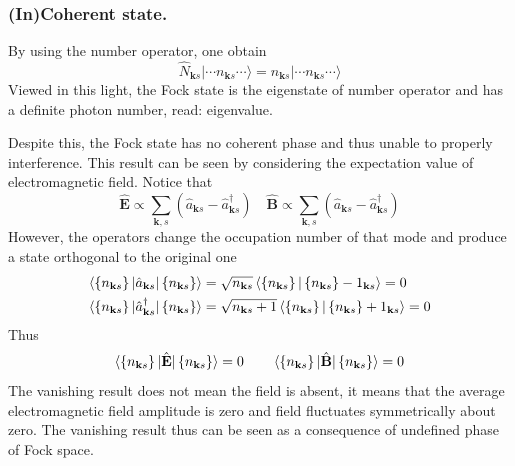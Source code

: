 \documentclass[../../../main.tex]{subfiles}
\begin{document}
\subsubsection{(In)Coherent state.}
By using the number operator, one obtain
\begin{equation*}
  \hat{N}_{\mathbf{k }s} | \cdots n_{\mathbf{k }s} \cdots \rangle = n_{\mathbf{k }s}  | \cdots n_{\mathbf{k }s}  \cdots \rangle
\end{equation*}
Viewed in this light, the Fock state is the eigenstate of number operator and has a definite photon number, read: eigenvalue.

Despite this, the Fock state has no coherent phase and thus unable to properly interference.
This result can be seen by considering the expectation value of electromagnetic field.
Notice that
\begin{equation*}
  \hat{\mathbf{E}} \propto \sum_{\mathbf{k},s} \left( \hat{a}_{\mathbf{k }s} -\hat{a}^\dagger_{\mathbf{k }s}  \right) \quad
  \hat{\mathbf{B}} \propto \sum_{\mathbf{k},s} \left( \hat{a}_{\mathbf{k }s} -\hat{a}^\dagger_{\mathbf{k }s}  \right)
\end{equation*}
However, the operators change the occupation number of that mode and produce a state orthogonal to the original one
\begin{align*}
  \braket{\left\{ n_{\mathbf{k }s} \right\}   | \hat{a}_{\mathbf{k }s} |\left\{ n_{\mathbf{k }s} \right\} }
   & =   \sqrt{n_{\mathbf{k }s}} \braket{\left\{ n_{\mathbf{k }s} \right\}  | \left\{ n_{\mathbf{k }s} \right\} -1_{\mathbf{k }s}} =0     \\
  \braket{\left\{ n_{\mathbf{k }s} \right\}  | \hat{a}^\dagger_{\mathbf{k }s}  |\left\{ n_{\mathbf{k }s} \right\} }
   & =   \sqrt{n_{\mathbf{k }s}+1} \braket{\left\{ n_{\mathbf{k }s} \right\}  | \left\{ n_{\mathbf{k }s} \right\} + 1_{\mathbf{k }s}} = 0
\end{align*}
Thus
\begin{equation*}
  \braket{\left\{ n_{\mathbf{k }s} \right\}  | \hat{\mathbf{E }}|\left\{ n_{\mathbf{k }s} \right\} }=0\qquad
  \braket{\left\{ n_{\mathbf{k }s} \right\}  | \hat{\mathbf{B }}|\left\{ n_{\mathbf{k }s} \right\} }=0
\end{equation*}
The vanishing result does not mean the field is absent, it means that the average electromagnetic field amplitude is zero and field fluctuates symmetrically about zero.
The vanishing result thus can be seen as a consequence of undefined phase of Fock space.
\end{document}
